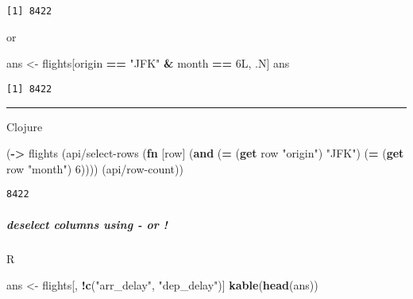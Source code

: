 \documentclass[]{article}
\newenvironment{Shaded}{\begin{snugshade}}{\end{snugshade}}
\newcommand{\DecValTok}[1]{\textcolor[rgb]{0.00,0.00,0.81}{#1}}
\newcommand{\KeywordTok}[1]{\textcolor[rgb]{0.13,0.29,0.53}{\textbf{#1}}}
\newcommand{\NormalTok}[1]{#1}
\newcommand{\OperatorTok}[1]{\textcolor[rgb]{0.81,0.36,0.00}{\textbf{#1}}}
\newcommand{\StringTok}[1]{\textcolor[rgb]{0.31,0.60,0.02}{#1}}
\let\oldsubparagraph\subparagraph
\renewcommand{\subparagraph}[1]{\oldsubparagraph{#1}\mbox{}}
\begin{document}
\begin{verbatim}
[1] 8422
\end{verbatim}

or

\begin{Shaded}
\begin{Highlighting}[]
\NormalTok{ans <-}\StringTok{ }\NormalTok{flights[origin }\OperatorTok{==}\StringTok{ "JFK"} \OperatorTok{&}\StringTok{ }\NormalTok{month }\OperatorTok{==}\StringTok{ }\NormalTok{6L, .N]}
\NormalTok{ans}
\end{Highlighting}
\end{Shaded}

\begin{verbatim}
[1] 8422
\end{verbatim}

\begin{center}\rule{0.5\linewidth}{0.5pt}\end{center}

Clojure

\begin{Shaded}
\begin{Highlighting}[]
\NormalTok{(}\KeywordTok{->}\NormalTok{ flights}
\NormalTok{    (api/select-rows (}\KeywordTok{fn}\NormalTok{ [row] (}\KeywordTok{and}\NormalTok{ (}\KeywordTok{=}\NormalTok{ (}\KeywordTok{get}\NormalTok{ row }\StringTok{"origin"}\NormalTok{) }\StringTok{"JFK"}\NormalTok{)}
\NormalTok{                                   (}\KeywordTok{=}\NormalTok{ (}\KeywordTok{get}\NormalTok{ row }\StringTok{"month"}\NormalTok{) }\DecValTok{6}\NormalTok{))))}
\NormalTok{    (api/row-count))}
\end{Highlighting}
\end{Shaded}

\begin{verbatim}
8422
\end{verbatim}

\hypertarget{deselect-columns-using---or}{%
\subparagraph{deselect columns using - or
!}\label{deselect-columns-using---or}}

R

\begin{Shaded}
\begin{Highlighting}[]
\NormalTok{ans <-}\StringTok{ }\NormalTok{flights[, }\OperatorTok{!}\KeywordTok{c}\NormalTok{(}\StringTok{"arr_delay"}\NormalTok{, }\StringTok{"dep_delay"}\NormalTok{)]}
\KeywordTok{kable}\NormalTok{(}\KeywordTok{head}\NormalTok{(ans))}
\end{Highlighting}
\end{Shaded}
\end{document}

